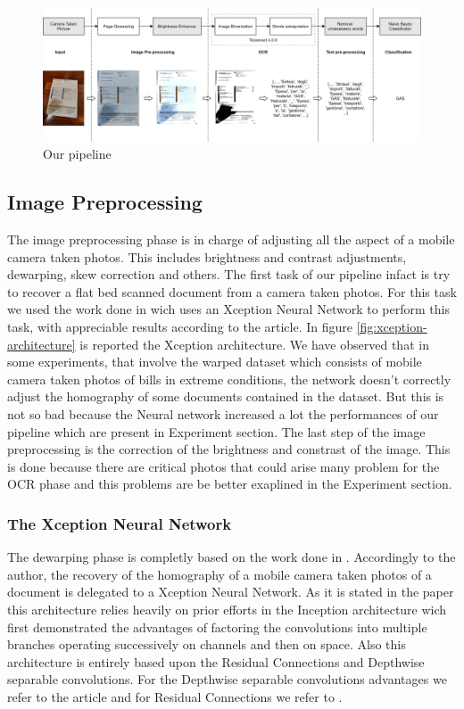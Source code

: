 \documentclass[10pt,twocolumn,letterpaper]{article}
\begin{document}
\begin{figure}[h]
  \centering
  \includegraphics[width=1.0\textwidth]{images/pipeline.png}
  \caption{Our pipeline}
  \label{fig:pipeline}
\end{figure}

\subsection{Image Preprocessing}

The image preprocessing phase is in charge of adjusting all the aspect
of a mobile camera taken photos. This includes brightness and contrast
adjustments, dewarping, skew correction and others. The first task of
our pipeline infact is try to recover a flat bed scanned document from
a camera taken photos. For this task we used the work done in
\cite{Korber18} wich uses an Xception Neural Network \cite{Xception}
to perform this task, with appreciable results according to the
article. In figure \ref{fig:xception-architecture} is reported the
Xception architecture.  We have observed that in some experiments,
that involve the warped dataset which consists of mobile camera taken
photos of bills in extreme conditions, the network doesn't correctly
adjust the homography of some documents contained in the dataset. But
this is not so bad because the Neural network increased a lot the
performances of our pipeline which are present in Experiment
section. The last step of the image preprocessing is the correction of
the brightness and constrast of the image. This is done because there
are critical photos that could arise many problem for the OCR phase
and this problems are be better exaplined in the Experiment section.

\subsubsection{The Xception Neural Network}

The dewarping phase is completly based on the work done in
\cite{Korber18}. Accordingly to the author, the recovery of the
homography of a mobile camera taken photos of a document is delegated
to a Xception Neural Network. As it is stated in the paper
\cite{Xception} this architecture relies heavily on prior efforts in
the Inception architecture wich first demonstrated the advantages of
factoring the convolutions into multiple branches operating
successively on channels and then on space. Also this architecture is
entirely based upon the Residual Connections and Depthwise separable
convolutions. For the Depthwise separable convolutions advantages we
refer to the article \cite{Wang18} and for Residual Connections we
refer to \cite{Sahoo17}.
\end{document}
